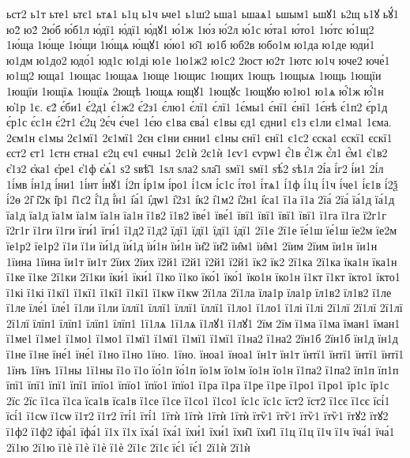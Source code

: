 {ьст2
ь1т
ьте1
ьтє1
ьтѧ1
ь1ц
ь1ч
ьче1
ь1ш2
ьша1
ьшаѧ1
ьшым1
ьшꙋ1
ь2щ
ь1ꙋ
ьꙋ́1
ю2̀
ю2́
2ю́б
ю́б1л
ю́дї1
ю́дї1
ю́дꙋ1
ю́1ж
1ю́з
ю́2л
ю́1с
ю́та1
ю́то1
1ю́тс
ю́1щ2
1ю́ща
1ю́ще
1ю́щи
1ю́щѧ
ю́щꙋ1
ю́ю1
ю̑1
ю1б
юб2в
юбо1м
ю1да
ю1де
юди́1
ю1дм
ю1до2
юдо́1
юд1с
ю1ді
ю1е
1ю1ж2
ю1с2
2юст
ю2т
1ютс
ю1ч
юче2
юче́1
ю1щ2
юща1
1ющас
1ющаѧ
1юще
1ющис
1ющих
1ющъ
1ющыѧ
1ющь
1ющїи
1ющїи
1ющїѧ
1ющїѧ
2ющѣ
1ющѧ
ющꙋ1
1ющꙋс
1ющꙋю
ю1ю1
ю1ѧ
ю҆́1ж
ю҆́1н
ю҆1р
1є.
є2́
є́би1
є́2д1
є́1ж2
є́2з1
є́лю1
є́лї1
є́лї1
1є́мы1
є́нї1
є́нї1
1є́нѣ
є́1п2
є́р1д
є́р1с
є́с1н
є́2т1
є́2ц
2є́ч
є́че1
1є́ю
є1ва
єва́1
є1вы
єд1
єдни1
є1з
є1ли
є1ма1
1єма.
2єм1н
є1мы
2є1мї1
2є1мї1
2єн
є1ни
єнни1
є1ны
єнї1
єнї1
є1с2
єска1
єскї1
єскї1
єст2
єт1
1єтн
єтна1
є2ц
єч1
єчны1
2є1ѝ
2є1ѝ
1єѵ1
єѵрѡ1
є҆́1в
є҆́1ж
є҆́л1
є҆́м1
є҆1в2
є҆1з2
є҆ка1
є҆ре1
є҆1ф
є҆ѧ́1
ѕ2
ѕвѣ̑1
1ѕл
ѕла2
ѕла̑1
ѕмї1
ѕмї1
ѕѣ́2
ѕѣ1л
2і́а
і́г2
і́и1
2і́л
1і́мв
і́н1д
і́ни1
1і́нт
і́нꙋ1
і́2п
і́р1м
і́ро1
і́1см
і́с1с
і́то1
і́тѧ1
і́1ф
і́1ц
і́1ч
і́че1
і́є1в
і́2ѯ
і́2ѳ
2і̑
і̑2к
і̑р1
і̑1с2
і҆́1д
і҆́н1
і҆а́1
і҆дѡ1
і҆2з1
і҆к2
і҆1м2
і҆2н1
і҆са1
ї1а
ї1а
2їа́
2їа́
їа́1д
їа́1д
їа1д
їа1д
їа1м
їа1м
їа1н
їа1н
ї1в2
ї1в2
їве́1
їве́1
ївї1
ївї1
ївї1
ївї1
ї1га
ї1га
ї2г1г
ї2г1г
ї1ги
ї1ги
їги́1
їги́1
ї1д2
ї1д2
їдї1
їдї1
їдї1
їдї1
2ї1е
2ї1е
їе́1ш
їе́1ш
їе2м
їе2м
їе1р2
їе1р2
ї1и
ї1и
їи́1д
їи́1д
їи́1н
їи́1н
їи̑2
їи̑2
їи̑м1
їи̑м1
2їим
2їим
їи1н
їи1н
1їина
1їина
їи1т
їи1т
2їих
2їих
ї2й1
ї2й1
ї2й1
ї2й1
їк2
їк2
2ї1ка
2ї1ка
їка1н
їка1н
ї1ке
ї1ке
2ї1ки
2ї1ки
їки́1
їки́1
ї1ко
ї1ко
їко́1
їко́1
їко1н
їко1н
ї1кт
ї1кт
їкто1
їкто1
ї1кі
ї1кі
ї1кї1
ї1кї1
ї1кї1
ї1кї1
ї1кѡ
ї1кѡ
2ї1ла
2ї1ла
їла1р
їла1р
їл1в2
їл1в2
ї1ле
ї1ле
їле́1
їле́1
ї1ли
ї1ли
їллї1
їллї1
їллї1
їллї1
ї1ло1
ї1ло1
ї1лі
ї1лі
2ї1лї
2ї1лї
2ї1лї
2ї1лї
їлїп1
їлїп1
їлїп1
їлїп1
1ї1лѧ
1ї1лѧ
ї1лꙋ1
ї1лꙋ1
2їм
2їм
ї1ма
ї1ма
їман1
їман1
ї1ме1
ї1ме1
ї1мо1
ї1мо1
ї1мї1
ї1мї1
ї1мї1
ї1мї1
ї1на2
ї1на2
2їн1б
2їн1б
їн1д
їн1д
ї1не
ї1не
їне́1
їне́1
ї1но
ї1но
1їно.
1їно.
їноа1
їноа1
їн1т
їн1т
їнтї1
їнтї1
їнтї1
їнтї1
1їнъ
1їнъ
1ї1ны
1ї1ны
ї1о
ї1о
їо́1п
їо́1п
їо1м
їо1м
їо1н
їо1н
ї1па2
ї1па2
їп1п
їп1п
їпї1
їпї1
їпї1
їпї1
їпїо1
їпїо1
їпїо1
їпїо1
ї1ра
ї1ра
ї1ре
ї1ре
ї1ро1
ї1ро1
їр1с
їр1с
2їс
2їс
ї1са
ї1са
їса1в
їса1в
ї1се
ї1се
ї1со1
ї1со1
їс1с
їс1с
їст2
їст2
ї1сє
ї1сє
їсі́1
їсі́1
ї1сѡ
ї1сѡ
ї1т2
ї1т2
їті́1
їті́1
1їтѝ
1їтѝ
1їтѝ
1їтѝ
їтѷ1
їтѷ1
їтѷ1
їтѷ1
їтꙋ2
їтꙋ2
ї1ф2
ї1ф2
їфа́1
їфа́1
ї1х
ї1х
їха́1
їха́1
їхи́1
їхи́1
їхи̑1
їхи̑1
ї1ц
ї1ц
ї1ч
ї1ч
їча́1
їча́1
2ї1ю
2ї1ю
ї1ѐ
ї1ѐ
ї1ѐ
ї1ѐ
2ї1є
2ї1є
їє́1
їє́1
2ї1ѝ
2ї1ѝ
}
